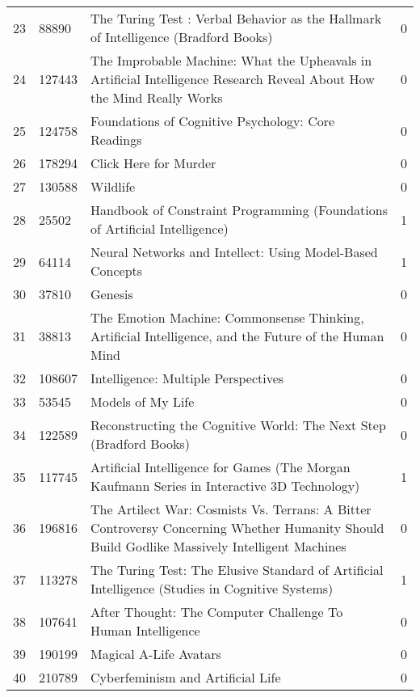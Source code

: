 \begin{tabular}{llll}
23 & 88890 & The Turing Test : Verbal Behavior as the Hallmark of Intelligence (Bradford Books) & 0 \\
24 & 127443 & The Improbable Machine: What the Upheavals in Artificial Intelligence Research Reveal About How the Mind Really Works & 0 \\
25 & 124758 & Foundations of Cognitive Psychology: Core Readings & 0 \\
26 & 178294 & Click Here for Murder & 0 \\
27 & 130588 & Wildlife & 0 \\
28 & 25502 & Handbook of Constraint Programming (Foundations of Artificial Intelligence) & 1 \\
29 & 64114 & Neural Networks and Intellect: Using Model-Based Concepts & 1 \\
30 & 37810 & Genesis & 0 \\
31 & 38813 & The Emotion Machine: Commonsense Thinking, Artificial Intelligence, and the Future of the Human Mind & 0 \\
32 & 108607 & Intelligence: Multiple Perspectives & 0 \\
33 & 53545 & Models of My Life & 0 \\
34 & 122589 & Reconstructing the Cognitive World: The Next Step (Bradford Books) & 0 \\
35 & 117745 & Artificial Intelligence for Games (The Morgan Kaufmann Series in Interactive 3D Technology) & 1 \\
36 & 196816 & The Artilect War: Cosmists Vs. Terrans: A Bitter Controversy Concerning Whether Humanity Should Build Godlike Massively Intelligent Machines & 0 \\
37 & 113278 & The Turing Test: The Elusive Standard of Artificial Intelligence (Studies in Cognitive Systems) & 1 \\
38 & 107641 & After Thought: The Computer Challenge To Human Intelligence & 0 \\
39 & 190199 & Magical A-Life Avatars & 0 \\
40 & 210789 & Cyberfeminism and Artificial Life & 0 \\
\bottomrule
\end{tabular}

